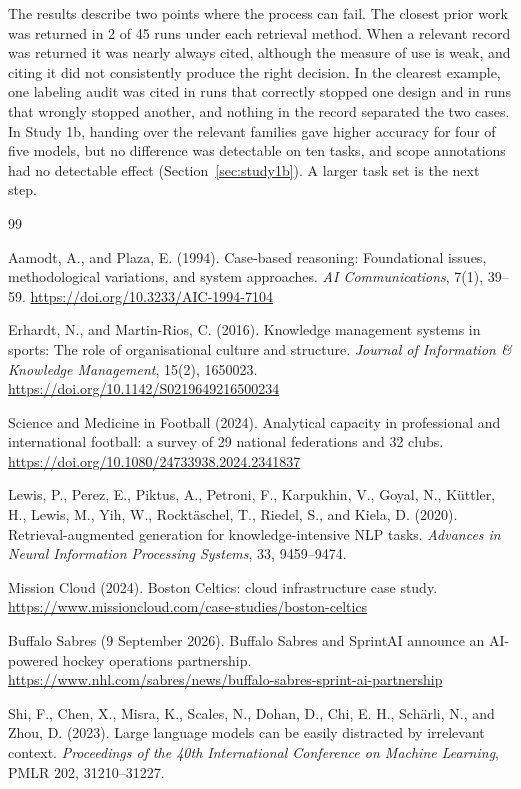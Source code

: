 \documentclass[11pt]{article}
\begin{document}
The results describe two points where the process can fail. The closest prior work was returned in 2 of 45 runs under each retrieval method. When a relevant record was returned it was nearly always cited, although the measure of use is weak, and citing it did not consistently produce the right decision. In the clearest example, one labeling audit was cited in runs that correctly stopped one design and in runs that wrongly stopped another, and nothing in the record separated the two cases. In Study 1b, handing over the relevant families gave higher accuracy for four of five models, but no difference was detectable on ten tasks, and scope annotations had no detectable effect (Section~\ref{sec:study1b}). A larger task set is the next step.

\begin{thebibliography}{99}

Aamodt, A., and Plaza, E. (1994).
Case-based reasoning: Foundational issues, methodological variations, and system approaches.
\textit{AI Communications}, 7(1), 39--59.
\url{https://doi.org/10.3233/AIC-1994-7104}

Erhardt, N., and Martin-Rios, C. (2016).
Knowledge management systems in sports: The role of organisational culture and structure.
\textit{Journal of Information \& Knowledge Management}, 15(2), 1650023.
\url{https://doi.org/10.1142/S0219649216500234}

Science and Medicine in Football (2024).
Analytical capacity in professional and international football: a survey of 29 national federations and 32 clubs.
\url{https://doi.org/10.1080/24733938.2024.2341837}

Lewis, P., Perez, E., Piktus, A., Petroni, F., Karpukhin, V., Goyal, N., K\"uttler, H., Lewis, M., Yih, W., Rockt\"aschel, T., Riedel, S., and Kiela, D. (2020).
Retrieval-augmented generation for knowledge-intensive NLP tasks.
\textit{Advances in Neural Information Processing Systems}, 33, 9459--9474.

Mission Cloud (2024).
Boston Celtics: cloud infrastructure case study.
\url{https://www.missioncloud.com/case-studies/boston-celtics}

Buffalo Sabres (9 September 2026).
Buffalo Sabres and SprintAI announce an AI-powered hockey operations partnership.
\url{https://www.nhl.com/sabres/news/buffalo-sabres-sprint-ai-partnership}

Shi, F., Chen, X., Misra, K., Scales, N., Dohan, D., Chi, E. H., Sch\"arli, N., and Zhou, D. (2023).
Large language models can be easily distracted by irrelevant context.
\textit{Proceedings of the 40th International Conference on Machine Learning}, PMLR 202, 31210--31227.


\end{thebibliography}
\end{document}
